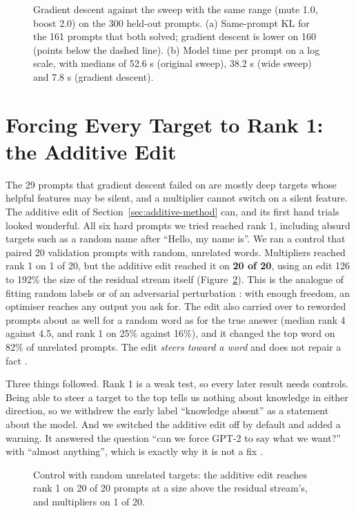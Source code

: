 \begin{figure}[!htb]
\centering
{}
\caption{Gradient descent against the sweep with the same range (mute 1.0, boost 2.0) on the 300 held-out prompts. (a) Same-prompt KL for the 161 prompts that both solved; gradient descent is lower on 160 (points below the dashed line). (b) Model time per prompt on a log scale, with medians of 52.6 s (original sweep), 38.2 s (wide sweep) and 7.8 s (gradient descent).}\label{fig:gdside}
\end{figure}

\section{Forcing Every Target to Rank 1: the Additive Edit}\label{sec:additive-story}

The 29 prompts that gradient descent failed on are mostly deep targets whose helpful features may be silent, and a multiplier cannot switch on a silent feature. The additive edit of Section~\ref{sec:additive-method} can, and its first hand trials looked wonderful. All six hard prompts we tried reached rank 1, including absurd targets such as a random name after ``Hello, my name is''. We ran a control that paired 20 validation prompts with random, unrelated words. Multipliers reached rank 1 on 1 of 20, but the additive edit reached it on \textbf{20 of 20}, using an edit 126 to 192\% the size of the residual stream itself (Figure~\ref{fig:addctl}). This is the analogue of fitting random labels \cite{r52} or of an adversarial perturbation \cite{r50,r51}: with enough freedom, an optimiser reaches any output you ask for. The edit also carried over to reworded prompts about as well for a random word as for the true answer (median rank 4 against 4.5, and rank 1 on 25\% against 16\%), and it changed the top word on 82\% of unrelated prompts. The edit \emph{steers toward a word} and does not repair a fact \cite{p14}.

Three things followed. Rank 1 is a weak test, so every later result needs controls. Being able to steer a target to the top tells us nothing about knowledge in either direction, so we withdrew the early label ``knowledge absent'' as a statement about the model. And we switched the additive edit off by default and added a warning. It answered the question ``can we force GPT-2 to say what we want?'' with ``almost anything'', which is exactly why it is not a fix \cite{p14}.

\begin{figure}[!htb]
\centering
{}
\caption{Control with random unrelated targets: the additive edit reaches rank 1 on 20 of 20 prompts at a size above the residual stream's, and multipliers on 1 of 20.}\label{fig:addctl}
\end{figure}

